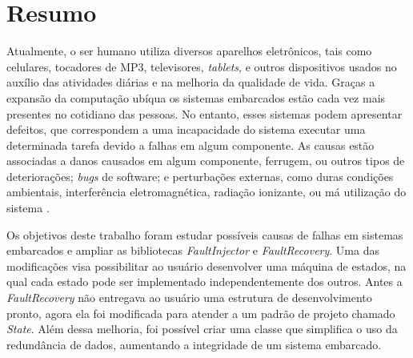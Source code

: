 
\chapter*{Resumo}

Atualmente, o ser humano utiliza diversos aparelhos eletrônicos, tais como celulares, tocadores de MP3, televisores, \textit{tablets}, e outros dispositivos usados no auxílio das atividades diárias e na melhoria da qualidade de vida. Graças a expansão da computação ubíqua os sistemas embarcados estão cada vez mais presentes no cotidiano das pessoas. No entanto, esses sistemas podem apresentar defeitos, que correspondem a uma incapacidade do sistema executar uma determinada tarefa devido a falhas em algum componente. As causas estão associadas a danos causados em algum componente, ferrugem, ou outros tipos de deteriorações; \textit{bugs} de software; e perturbações externas, como duras condições ambientais, interferência eletromagnética, radiação ionizante, ou má utilização do sistema \cite{Nelson:1990}.

Os objetivos deste trabalho foram estudar possíveis causas de falhas em sistemas embarcados e ampliar as bibliotecas \textit{FaultInjector} e \textit{FaultRecovery}. Uma das modificações visa possibilitar ao usuário desenvolver uma máquina de estados, na qual cada estado pode ser implementado independentemente dos outros. Antes a \textit{FaultRecovery} não entregava ao usuário uma estrutura de desenvolvimento pronto, agora ela foi modificada para atender a um padrão de projeto chamado \textit{State}. Além dessa melhoria, foi possível criar uma classe que simplifica o uso da redundância de dados, aumentando a integridade de um sistema embarcado.

